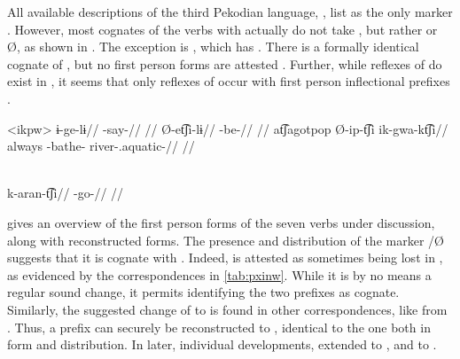 All available descriptions of the third Pekodian language, \ikpeng, list  as the only  marker \parencites[55]{ikpengpacheco1997}[105]{campetela1997analise}[64]{ikpengpacheco2001}[205]{alves2013verbo}.
However, most \ikpeng cognates of the \arara verbs with   actually do not take , but rather  or Ø, as shown in .
The exception is , which has  .
There is a formally identical \ikpeng cognate of \arara {} , but no first person forms are attested .
Further, while reflexes of   do exist in \ikpeng, it seems that only reflexes of  occur with first person inflectional prefixes \parencite[401]{gildea2018reconstructing}.

\pex<ikpw>\ikpeng
{}
\begingl
\gla ɨ-ge-lɨ//
\glb {}-say-//
\glft {} \parencite[][209]{ikpengpacheco2001}//
\endgl
{}
\begingl
\gla Ø-et͡ʃi-lɨ//
\glb {}-be-//
\glft {} \parencite[][139]{ikpengpacheco2001}//
\endgl
{}
\begingl
\gla at͡ʃagotpop Ø-ip-t͡ʃi ik-gwa-kt͡ʃi//
\glb always -bathe- river-.aquatic-//
\glft {} \parencite[][68]{ikpengpacheco1997}//
\endgl
\xe

\ikpeng \parencite[][80]{ikpengpacheco2001}\\
\begingl
\gla k-aran-t͡ʃi//
\glb {}-go-//
\glft {}//
\endgl
\xe



 gives an overview of the first person forms of the seven verbs under discussion, along with reconstructed \PPek forms.
The presence and distribution of the \ikpeng {} marker /Ø suggests that it is cognate with \arara {} .
Indeed, \PXin {} is attested as sometimes being lost in \ikpeng, as evidenced by the correspondences in \cref{tab:pxinw}.
While it is by no means a regular sound change, it permits identifying the two prefixes as cognate.
Similarly, the suggested change of  to \bakairi {} is found in other correspondences, like  \parencite{meira2005southern} from \PC {}  \parencite[4]{gildea2007greenberg}.
Thus, a  prefix  can securely be reconstructed to \PPek, identical to the \arara one both in form and distribution.
In later, individual developments, \bakairi extended  to , and \ikpeng to .

